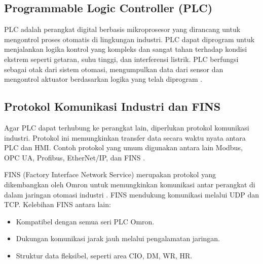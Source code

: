 \subsection{Programmable Logic Controller (PLC)}
PLC adalah perangkat digital berbasis mikroprosesor yang dirancang untuk mengontrol proses otomatis di lingkungan industri. PLC dapat diprogram untuk menjalankan logika kontrol yang kompleks dan sangat tahan terhadap kondisi ekstrem seperti getaran, suhu tinggi, dan interferensi listrik. PLC berfungsi sebagai otak dari sistem otomasi, mengumpulkan data dari sensor dan mengontrol aktuator berdasarkan logika yang telah diprogram \parencite{emqx2023fins}.

\subsection{Protokol Komunikasi Industri dan FINS}
Agar PLC dapat terhubung ke perangkat lain, diperlukan protokol komunikasi industri. Protokol ini memungkinkan transfer data secara waktu nyata antara PLC dan HMI. Contoh protokol yang umum digunakan antara lain Modbus, OPC UA, Profibus, EtherNet/IP, dan FINS \parencite{joshi2024study}.


FINS (Factory Interface Network Service) merupakan protokol yang dikembangkan oleh Omron untuk memungkinkan komunikasi antar perangkat di dalam jaringan otomasi industri \parencite{humaj2021fins}. FINS mendukung komunikasi melalui UDP dan TCP. Kelebihan FINS antara lain:
\begin{itemize}
    \item Kompatibel dengan semua seri PLC Omron.
    \item Dukungan komunikasi jarak jauh melalui pengalamatan jaringan.
    \item Struktur data fleksibel, seperti area CIO, DM, WR, HR.
\end{itemize}


